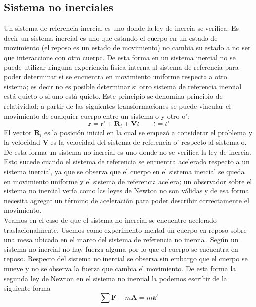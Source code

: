 \documentclass[a4paper]{article}
\numberwithin{equation}{section}
\begin{document}
		\subsection{Sistema no inerciales}
            Un sistema de referencia inercial es uno donde la ley de inercia se verifica. Es decir un sistema inercial es uno que estando el cuerpo en un estado de movimiento (el reposo es un estado de movimiento) no cambia su estado a no ser que interaccione con otro cuerpo. De esta forma en un sistema inercial no se puede utilizar ninguna experiencia física interna al sistema de referencia para poder determinar si se encuentra en movimiento uniforme respecto a otro sistema; es decir no es posible determinar si otro sistema de referencia inercial está quieto o si uno está quieto. Este principio se denomina principio de relatividad; a partir de las siguientes transformaciones se puede vincular el movimiento de cualquier cuerpo entre un sistema o y otro o':
            \begin{equation}
                \boldsymbol{r} = \boldsymbol{r'} + \boldsymbol{R}_{i} + \boldsymbol{V}t \qquad t = t'
            \end{equation}
            El vector $\boldsymbol{R}_{i}$ es la posición inicial en la cual se empezó a considerar el problema y la velocidad $\boldsymbol{V}$ es la velocidad del sistema de referencia o' respecto al sistema o.\\
            De esta forma un sistema no inercial es uno donde no se verifica la ley de inercia. Esto sucede cuando el sistema de referencia se encuentra acelerado respecto a un sistema inercial, ya que se observa que el cuerpo en el sistema inercial se queda en movimiento uniforme y el sistema de referencia acelera; un observador sobre el sistema no inercial vería como las leyes de Newton no son válidas y de esa forma necesita agregar un término de aceleración para poder describir correctamente el movimiento.\\
            Veamos en el caso de que el sistema no inercial se encuentre acelerado traslacionalmente. Usemos como experimento mental un cuerpo en reposo sobre una mesa ubicado en el marco del sistema de referencia no inercial. Según un sistema no inercial no hay fuerza alguna por lo que el cuerpo se encuentra en reposo. Respecto del sistema no inercial se observa sin embargo que el cuerpo se mueve y no se observa la fuerza que cambia el movimiento. De esta forma la segunda ley de Newton en el sistema no inercial la podemos escribir de la siguiente forma
            \begin{equation}
                \sum \boldsymbol{F} - m \boldsymbol{A} = m \boldsymbol{a}'
                \label{eq:sni_tras}
            \end{equation}
\end{document}
